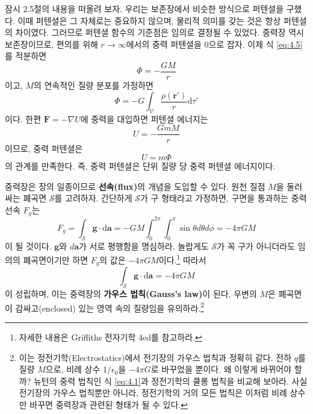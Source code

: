 \documentclass[chapter, oneside, b5paper]{oblivoir}
\theoremstyle{plain}
\theoremstyle{definition}
\theoremstyle{remark}
\begin{document}
잠시 2.5절의 내용을 떠올려 보자. 우리는 보존장에서 비슷한 방식으로 퍼텐셜을 구했다. 이때 퍼텐셜은 그 자체로는 중요하지 않으며, 물리적 의미를 갖는 것은 항상 퍼텐셜의 차이였다. 그러므로 퍼텐셜 함수의 기준점은 임의로 결정될 수 있었다. 중력장 역시 보존장이므로, 편의를 위해 $r \to \infty$에서의 중력 퍼텐셜을 0으로 잡자. 이제 식 \ref{eq:4.5}를 적분하면
\begin{equation}
    \Phi = -\frac{GM}{r}
\end{equation}
이고, $M$의 연속적인 질량 분포를 가정하면
\begin{equation}
    \Phi = -G\int_{\mathcal{V}} \frac{\rho( \mathbf{r'})}{r} \mathrm{d}\tau'
\end{equation}
이다. 한편 $\mathbf{F} = - \nabla U$에 중력을 대입하면 퍼텐셜 에너지는
\begin{equation}
    U = -\frac{GmM}{r}
\end{equation}
이므로, 중력 퍼텐셜은
\begin{equation}
    U = m \Phi
\end{equation}
의 관계를 만족한다. 즉, 중력 퍼텐셜은 단위 질량 당 중력 퍼텐셜 에너지이다. 

중력장은 장의 일종이므로 \textbf{선속(flux)}의 개념을 도입할 수 있다. 원천 질점 $M$을 둘러싸는 폐곡면 $\mathcal{S}$를 고려하자. 간단하게 $\mathcal{S}$가 구 형태라고 가정하면, 구면을 통과하는 중력 선속 $F_g$는
\begin{equation}
    F_g = \int_{\mathcal{S}}\mathbf{g} \cdot \mathrm{d}\mathbf{a} = -GM\int_{0}^{2\pi} \int_{0}^{\pi} \sin{\theta} d\theta d\phi =-4\pi GM
\end{equation}
이 될 것이다. $\mathbf{g}$와 $d\mathbf{a}$가 서로 평행함을 명심하라. 놀랍게도 $\mathcal{S}$가 꼭 구가 아니더라도 임의의 폐곡면이기만 하면 $F_g$의 값은 $-4\pi GM$이다.\footnote{자세한 내용은 Griffiths 전자기학 4ed를 참고하라.} 따라서
\begin{equation}
    \int_{\mathcal{S}}\mathbf{g} \cdot \mathrm{d}\mathbf{a} = -4\pi GM
    \label{eq:4.11}
\end{equation}
이 성립하며, 이는 중력장의 \textbf{가우스 법칙(Gauss's law)}이 된다. 우변의 $M$은 폐곡면이 감싸고(enclosed) 있는 영역 속의 질량임을 유의하라.\footnote{이는 정전기학(Electrostatics)에서 전기장의 가우스 법칙과 정확히 같다. 전하 $q$를 질량 $M$으로, 비례 상수 $1/\epsilon_0$을 $-4\pi G$로 바꾸었을 뿐이다. 왜 이렇게 바뀌어야 할까? 뉴턴의 중력 법칙인 식 \ref{eq:4.1}과 정전기학의 쿨롱 법칙을 비교해 보아라. 사실 전기장의 가우스 법칙뿐만 아니라, 정전기학의 거의 모든 법칙은 이처럼 비례 상수만 바꾸면 중력장과 관련된 형태가 될 수 있다.}
\end{document}
